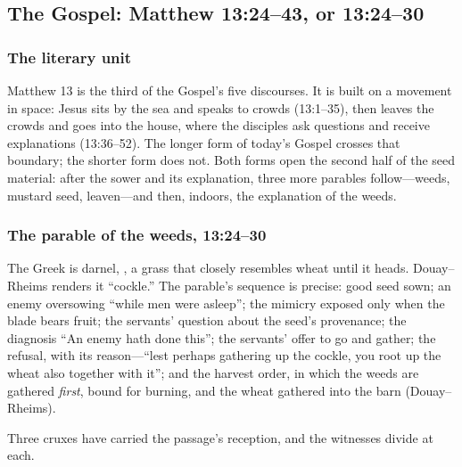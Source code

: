 \subsection*{The Gospel: Matthew 13:24--43, or 13:24--30}

\subsubsection*{The literary unit}

Matthew 13 is the third of the Gospel's five discourses. It is built on a
movement in space: Jesus sits by the sea and speaks to crowds (13:1--35), then
leaves the crowds and goes into the house, where the disciples ask questions
and receive explanations (13:36--52). The longer form of today's Gospel crosses
that boundary; the shorter form does not. Both forms open the second half of
the seed material: after the sower and its explanation, three more parables
follow---weeds, mustard seed, leaven---and then, indoors, the explanation of
the weeds.

\subsubsection*{The parable of the weeds, 13:24--30}

The Greek  is darnel, , a grass
that closely resembles wheat until it heads. Douay--Rheims renders it
``cockle.'' The parable's sequence is precise: good seed sown; an enemy
oversowing ``while men were asleep''; the mimicry exposed only when the blade
bears fruit; the servants' question about the seed's provenance; the diagnosis
``An enemy hath done this''; the servants' offer to go and gather; the refusal,
with its reason---``lest perhaps gathering up the cockle, you root up the wheat
also together with it''; and the harvest order, in which the weeds are gathered
\emph{first}, bound for burning, and the wheat gathered into the barn
(Douay--Rheims).

Three cruxes have carried the passage's reception, and the witnesses divide at
each.


